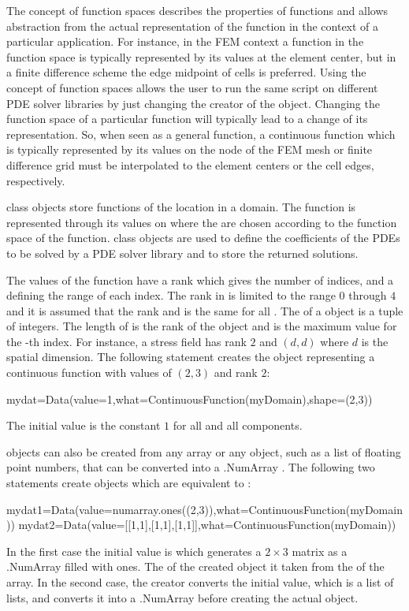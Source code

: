 The concept of function spaces describes the properties of 
functions and allows abstraction from the actual representation 
of the function in the context of a particular application. For instance, 
in the FEM context a
function in the \Function function space
is typically represented by its values at the element center, 
but in a finite difference scheme the edge midpoint of cells is preferred. 
Using the concept of function spaces 
allows the user to run the same script on different
PDE solver libraries by just changing the creator of the \Domain object.     
Changing the function space of a particular function
will typically lead to a change of its representation. 
So, when seen as a general function,
a continuous function which is typically represented by its values
on the node of the FEM mesh or finite difference grid 
must be interpolated to the element centers or the cell edges,
respectively.

\Data class objects store functions of the location in a domain. 
The function is represented through its values on \DataSamplePoints where
the \DataSamplePoints are chosen according to the function space 
of the function.  
\Data class objects are used to define the coefficients
of the PDEs to be solved by a PDE solver library 
and to store the returned solutions.

The values of the function have a rank which gives the
number of indices, and a \Shape defining the range of each index.
The rank in \escript is limited to the range $0$ through $4$ and
it is assumed that the rank and \Shape is the same for all \DataSamplePoints.
The \Shape of a \Data object is a tuple  of integers. The length
of  is the rank of the \Data object and  is the maximum
value for the -th index.
For instance, a stress field has rank $2$ and 
\Shape $(d,d)$ where $d$ is the spatial dimension.
The following statement creates the \Data object
 representing a 
continuous function with values 
of \Shape $(2,3)$ and rank $2$:
\begin{python}
mydat=Data(value=1,what=ContinuousFunction(myDomain),shape=(2,3))
\end{python}
The initial value is the constant $1$ for all \DataSamplePoints and
all components.

\Data objects can also be created from any \numarray
array or any object, such as a list of floating point numbers, 
that can be converted into a \numarray.NumArray . 
The following two statements
create objects which are equivalent to :
\begin{python}
mydat1=Data(value=numarray.ones((2,3)),what=ContinuousFunction(myDomain))
mydat2=Data(value=[[1,1],[1,1],[1,1]],what=ContinuousFunction(myDomain))
\end{python}
In the first case the initial value is 
which generates a $2 \times 3$ matrix as a \numarray.NumArray 
filled with ones. The \Shape of the created \Data object
it taken from the \Shape of the array. In the second
case, the creator converts the initial value, which is a list of lists,
and converts it into a \numarray.NumArray before creating the actual
\Data object.      

